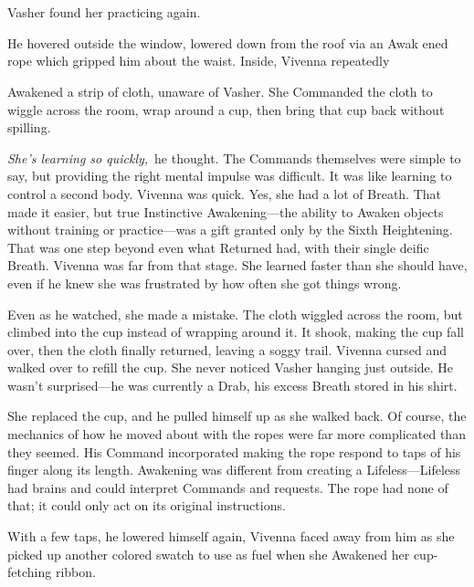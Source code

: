 \chapter{}

Vasher found her practicing again.

He hovered outside the window, lowered down from the roof via an Awak ened rope which gripped him about the waist. Inside, Vivenna repeatedly

Awakened a strip of cloth, unaware of Vasher. She Commanded the cloth to wiggle across the room, wrap around a cup, then bring that cup back without spilling.

\textit{She’s learning so quickly,}~he thought. The Commands themselves were simple to say, but providing the right mental impulse was difficult. It was like learning to control a second body. Vivenna was quick. Yes, she had a lot of Breath. That made it easier, but true Instinctive Awakening—the ability to Awaken objects without training or practice—was a gift granted only by the Sixth Heightening. That was one step beyond even what Returned had, with their single deific Breath. Vivenna was far from that stage. She learned faster than she should have, even if he knew she was frustrated by how often she got things wrong.

Even as he watched, she made a mistake. The cloth wiggled across the room, but climbed into the cup instead of wrapping around it. It shook, making the cup fall over, then the cloth finally returned, leaving a soggy trail. Vivenna cursed and walked over to refill the cup. She never noticed Vasher hanging just outside. He wasn’t surprised—he was currently a Drab, his excess Breath stored in his shirt.

She replaced the cup, and he pulled himself up as she walked back. Of course, the mechanics of how he moved about with the ropes were far more complicated than they seemed. His Command incorporated making the rope respond to taps of his finger along its length. Awakening was different from creating a Lifeless—Lifeless had brains and could interpret Commands and requests. The rope had none of that; it could only act on its original instructions.

With a few taps, he lowered himself again, Vivenna faced away from him as she picked up another colored swatch to use as fuel when she Awakened her cup-fetching ribbon.

